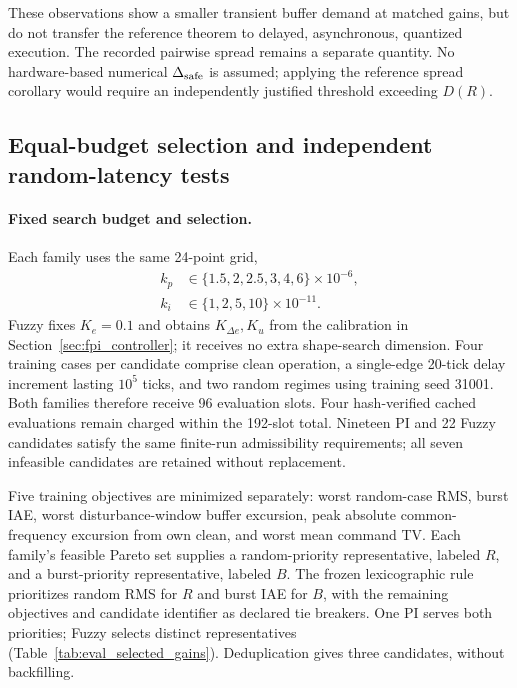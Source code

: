 These observations show a smaller transient buffer demand at matched
gains, but do not transfer the reference theorem
to delayed, asynchronous, quantized execution. The recorded pairwise
spread remains a separate quantity. No hardware-based numerical
$\Delta_{\rm safe}$ is assumed; applying the reference spread corollary
would require an independently justified threshold exceeding $D(R)$.

\subsection{Equal-budget selection and independent random-latency tests}
\label{subsec:eval_random}

\paragraph{Fixed search budget and selection.}
Each family uses the same 24-point grid,
\begin{align}
 k_p&\in\{1.5,2,2.5,3,4,6\}\times10^{-6},\nonumber\\
 k_i&\in\{1,2,5,10\}\times10^{-11}.
 \label{eq:eval_gain_grid}
\end{align}
Fuzzy fixes $K_e=0.1$ and obtains $K_{\Delta e},K_u$ from the
calibration in Section~\ref{sec:fpi_controller}; it receives no extra
shape-search dimension. Four training cases per candidate comprise
clean operation, a single-edge 20-tick delay increment lasting
$10^5$ ticks, and two random regimes using training seed 31001.
Both families therefore receive 96 evaluation slots. Four hash-verified
cached evaluations remain charged within the 192-slot total.
Nineteen PI and 22 Fuzzy candidates satisfy the same finite-run
admissibility requirements; all seven infeasible candidates are
retained without replacement.

Five training objectives are minimized separately: worst random-case
RMS, burst IAE, worst disturbance-window buffer excursion, peak absolute
common-frequency excursion from own clean, and worst mean command TV.
Each family's feasible Pareto set supplies a random-priority
representative, labeled $R$, and a burst-priority representative,
labeled $B$. The frozen lexicographic rule prioritizes random RMS for
$R$ and burst IAE for $B$, with the remaining objectives and candidate
identifier as declared tie breakers. One PI serves both priorities;
Fuzzy selects distinct representatives (Table~\ref{tab:eval_selected_gains}).
Deduplication gives three candidates, without backfilling.

